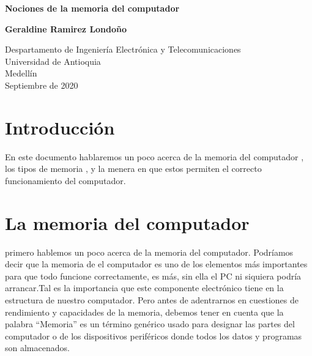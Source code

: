 \documentclass[12pt]{report}
\begin{document}
\begin{titlepage}
    \begin{center}
        \vspace*{1cm}
            
        \Huge
        \textbf{Nociones de la memoria del computador}
            
        \vspace{0.5cm}
        \LARGE
        
            
        \vspace{1.5cm}
            
        \textbf{Geraldine Ramirez Londoño }
            
        \vfill
            
        \vspace{0.8cm}
            
        \Large
        Despartamento de Ingeniería Electrónica y Telecomunicaciones\\
        Universidad de Antioquia\\
        Medellín\\
        Septiembre de 2020
            
    \end{center}
\end{titlepage}
\newpage

\tableofcontents
\newpage
\section{Introducción}


En este documento hablaremos un poco acerca de la memoria del computador , los tipos de memoria , y la menera en que estos  permiten el correcto funcionamiento del computador.

\section{La memoria del computador }
primero hablemos un poco acerca de la memoria del computador.
Podríamos decir que la memoria de el computador es uno de los elementos más importantes para que todo funcione correctamente, es más, sin ella el PC ni siquiera podría arrancar.Tal es la importancia que este componente electrónico tiene en la estructura de nuestro computador.
Pero antes de adentrarnos en cuestiones de rendimiento y capacidades de la memoria, debemos tener en cuenta que la palabra “Memoria” es un término genérico usado para designar las partes del computador o de los dispositivos periféricos donde todos los datos y programas son almacenados.
\end{document}
